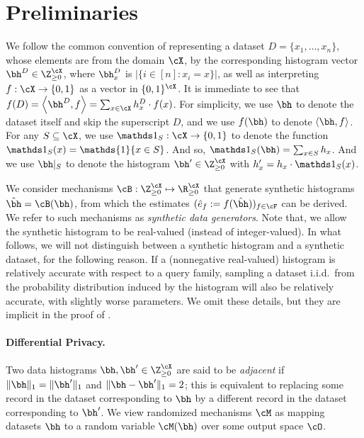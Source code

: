 \section{Preliminaries}\label{sec:prelims}


We follow the common convention of representing a dataset $D = \{x_1, \ldots, x_n\}$, whose elements are from the domain $\cX$, by the corresponding histogram vector $\bh^D \in \Z_{\ge 0}^{\cX}$, 
where $\bh^D_x$ is $|\{ i \in [n] : x_i = x \}|$, as well as interpreting $f: \cX \to \{0, 1\}$ as a vector in $\{0,1\}^{\cX}$. 
It is immediate to see that
$
f(D) = \ang{\bh^D, f} = \sum_{x \in \cX} h^D_x \cdot f(x)
$.
For simplicity, we use $\bh$ to denote the dataset itself and skip the superscript $D$, and we use $f(\bh)$ to denote $\ang{\bh, f}$. For any $S \subseteq \cX$, we use $\ind_S : \cX \to \{0, 1\}$ to denote the function $\ind_S(x) = \mathds{1}\{x \in S\}$. And so, $\ind_S(\bh) = \sum_{x \in S} h_x$. And we use $\bh|_S$ to denote the histogram $\bh' \in \Z_{\ge 0}^{\cX}$ with $h_x' = h_x \cdot \ind_S(x)$.

We consider mechanisms $\cB:\Z_{\ge 0}^{\cX}\mapsto \R_{\ge 0}^{\cX}$ that generate synthetic histograms $\hat{\bh} = \cB(\bh)$, from which the estimates $(\hat{e}_f := f(\hat{\bh}))_{f \in \cF}$ can be derived. We refer to such mechanisms as 
{\em synthetic data generators}.
Note that, we allow the synthetic histogram to be real-valued (instead of integer-valued). 
 In what follows, we will not distinguish between a synthetic histogram and a synthetic dataset, for the following reason.
 If a (nonnegative real-valued) histogram is relatively accurate with respect to a query family, sampling a dataset i.i.d.~from the probability distribution induced by the histogram will also be relatively accurate, with slightly worse parameters. We omit these details, but they are implicit in the proof of .

\paragraph{Differential Privacy.}
Two data histograms $\bh, \bh' \in \Z_{\ge 0}^{\cX}$ are said to be {\em adjacent} if
$\|\bh\|_1 = \|\bh'\|_1$ and $\|\bh - \bh'\|_1 = 2$; 
this is equivalent to replacing some record in the dataset corresponding to $\bh$ by a different record in the dataset corresponding to $\bh'$. We view randomized mechanisms $\cM$ as mapping datasets $\bh$ to a random variable $\cM(\bh)$ over some output space $\cO$.

